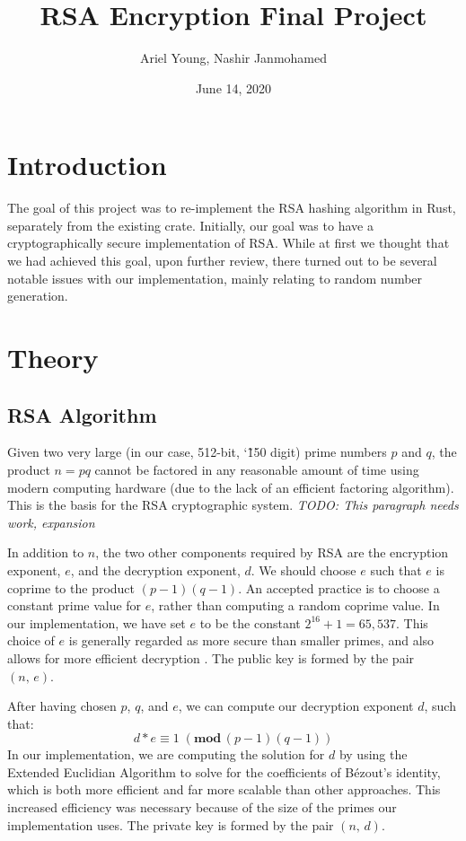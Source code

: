 \documentclass{article}
\title{RSA Encryption Final Project}
\author{Ariel Young, Nashir Janmohamed}
\date{June 14, 2020}
\begin{document}
\maketitle
\tableofcontents

\section{Introduction}
The goal of this project was to re-implement the RSA hashing algorithm in Rust, separately from the existing crate. Initially, our goal was to have a cryptographically secure implementation of RSA. While at first we thought that we had achieved this goal, upon further review, there turned out to be several notable issues with our implementation, mainly relating to random number generation.

\section{Theory}
\subsection{RSA Algorithm}
Given two very large (in our case, 512-bit, \char`\~ 150 digit) prime numbers $p$ and $q$, the product $n = pq$ cannot be factored in any reasonable amount of time using modern computing hardware (due to the lack of an efficient factoring algorithm). This is the basis for the RSA cryptographic system. \textit{TODO: This paragraph needs work, expansion}

In addition to $n$, the two other components required by RSA are the encryption exponent, $e$, and the decryption exponent, $d$. We should choose $e$ such that $e$ is coprime to the product $(p - 1)(q - 1)$. An accepted practice is to choose a constant prime value for $e$, rather than computing a random coprime value. In our implementation, we have set $e$ to be the constant $2^{16} + 1 = 65,537$. This choice of $e$ is generally regarded as more secure than smaller primes, and also allows for more efficient decryption \cite{rsa_attacks}. The public key is formed by the pair $(n,\, e)$.

After having chosen $p$, $q$, and $e$, we can compute our decryption exponent $d$, such that: \[ d*e \equiv 1 \;(\textbf{mod}\,(p - 1)(q - 1)) \] In our implementation, we are computing the solution for $d$ by using the Extended Euclidian Algorithm to solve for the coefficients of Bézout's identity, which is both more efficient and far more scalable than other approaches. This increased efficiency was necessary because of the size of the primes our implementation uses. The private key is formed by the pair $(n,\, d)$.
\end{document}
